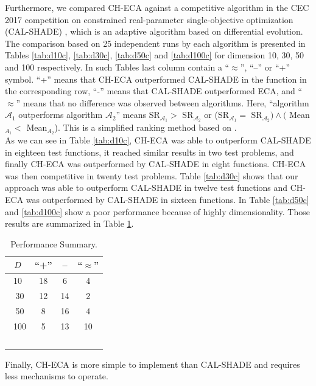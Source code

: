 \documentclass[conference]{IEEEtran}
\begin{document}
Furthermore, we compared CH-ECA against a  competitive algorithm in 
the CEC 2017 competition on constrained real-parameter single-objective optimization 
(CAL-SHADE) \cite{zamuda2017adaptive}, which is an adaptive algorithm based on 
differential evolution. The comparison based on 25 independent runs by each algorithm 
is presented in Tables \ref{tab:d10c}, \ref{tab:d30c}, \ref{tab:d50c} and 
\ref{tab:d100c} for dimension 10, 30, 50 and 100 respectively. In such Tables last 
column contain a ``$\approx$'', ``--'' or ``+'' symbol. ``+'' means that CH-ECA 
outperformed CAL-SHADE in the function in the corresponding row, ``-'' means that 
CAL-SHADE outperformed ECA, and  ``$\approx$'' means that no difference was 
observed between algorithms. Here, ``algorithm $\mathcal{A}_1$ outperforms algorithm 
$\mathcal{A}_2$'' means SR$_{\mathcal{A}_1} > $ SR$_{\mathcal{A}_2}$ or 
(SR$_{\mathcal{A}_1} = $ SR$_{\mathcal{A}_2}) \wedge ($ Mean$_{A_1} < $ Mean$_{A_2}$). 
This is a simplified ranking method based on \cite{cecCop17}. \\

As we can see in Table \ref{tab:d10c}, CH-ECA was able to outperform CAL-SHADE in 
eighteen test functions, it reached similar results in two test problems, and 
finally CH-ECA was outperformed by CAL-SHADE in eight functions. CH-ECA was then 
competitive in twenty test problems. %
%
Table \ref{tab:d30c} shows that our approach was able to outperform CAL-SHADE in 
twelve test functions and CH-ECA was outperformed by CAL-SHADE in sixteen functions.
%
In Table \ref{tab:d50c} and \ref{tab:d100c} show a poor performance because of 
highly dimensionality. Those results are summarized in Table \ref{tab:summary}.

\begin{table}[!ht]
	\caption{Performance Summary.}
	\label{tab:summary}
	\centering
	\begin{tabular}{c|ccc}
		$D$ & ``+'' &  -- & ``$\approx$'' \\ \hline
		10  & 18    &  6  & 4  \\ \
		30  & 12    &  14 & 2  \\ \
		50  & 8     &  16 & 4 \\ \
	   100  & 5     &  13 & 10  \\ \
	\end{tabular}
\end{table}


Finally, CH-ECA is more simple to implement than CAL-SHADE and requires less 
mechanisms to operate.
\end{document}
